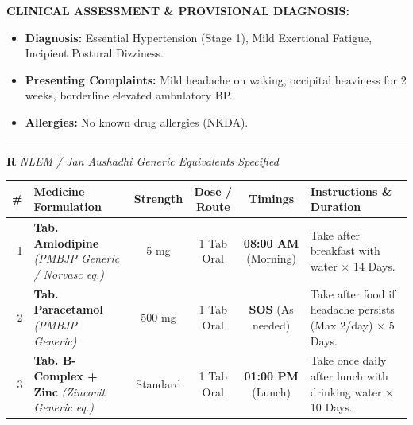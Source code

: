 \documentclass[10pt,a4paper]{article}
\begin{document}
\begin{tcolorbox}[
    colback=white,
    colframe=primary,
    arc=3mm,
    boxrule=1.5pt,
    left=10pt, right=10pt, top=8pt, bottom=8pt
]
\vspace{2pt}
\noindent\textbf{\color{primarydark}CLINICAL ASSESSMENT \& PROVISIONAL DIAGNOSIS:}
\begin{itemize}[leftmargin=16pt, topsep=1pt, itemsep=1pt]
    \item \textbf{Diagnosis:} Essential Hypertension (Stage 1), Mild Exertional Fatigue, Incipient Postural Dizziness.
    \item \textbf{Presenting Complaints:} Mild headache on waking, occipital heaviness for 2 weeks, borderline elevated ambulatory BP.
    \item \textbf{Allergies:} No known drug allergies (NKDA).
\end{itemize}

\vspace{2pt}
\noindent\textcolor{primary}{\rule{\linewidth}{1pt}}

\vspace{2pt}
{\huge\textbf{\color{primary}R}} \hfill {\small\textit{\color{darktext}NLEM / Jan Aushadhi Generic Equivalents Specified}}

\vspace{2pt}
\begin{tabularx}{\linewidth}{|r|X|c|c|c|X|}
\hline
\textbf{\#} & \textbf{Medicine Formulation} & \textbf{Strength} & \textbf{Dose / Route} & \textbf{Timings} & \textbf{Instructions \& Duration} \\
\hline
1 & \textbf{Tab. Amlodipine} \newline \textit{(PMBJP Generic / Norvasc eq.)} & 5 mg & 1 Tab Oral & \textbf{08:00 AM} (Morning) & Take after breakfast with water $\times$ 14 Days. \\
\hline
2 & \textbf{Tab. Paracetamol} \newline \textit{(PMBJP Generic)} & 500 mg & 1 Tab Oral & \textbf{SOS} (As needed) & Take after food if headache persists (Max 2/day) $\times$ 5 Days. \\
\hline
3 & \textbf{Tab. B-Complex + Zinc} \newline \textit{(Zincovit Generic eq.)} & Standard & 1 Tab Oral & \textbf{01:00 PM} (Lunch) & Take once daily after lunch with drinking water $\times$ 10 Days. \\
\hline
\end{tabularx}


\end{tcolorbox}
\end{document}
